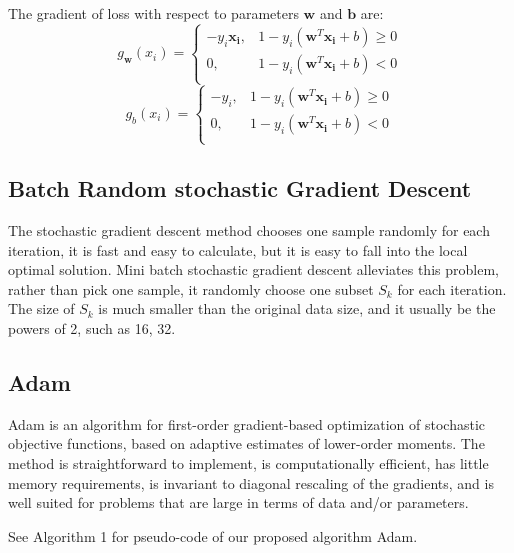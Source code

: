 \documentclass[journal, a4paper]{IEEEtran}
\begin{document}
The gradient of loss with respect to parameters $\bm{w}$ and $\bm{b}$ are:
\begin{equation}
g_{\bm{w}}(x_i)=
\left\{
             \begin{array}{lr}
             -y_i\bm{x_i}, &  1-y_i(\bm{w}^T\bm{x_i}+b) \ge 0\\
             0, & 1-y_i(\bm{w}^T\bm{x_i}+b) < 0\\
             \end{array}
\right.
\end{equation}
\begin{equation}
g_{b}(x_i)=
\left\{
             \begin{array}{lr}
             -y_i, &  1-y_i(\bm{w}^T\bm{x_i}+b) \ge 0\\
             0, & 1-y_i(\bm{w}^T\bm{x_i}+b) < 0\\
             \end{array}
\right.
\end{equation}


\subsection{Batch Random stochastic Gradient Descent}
The stochastic gradient descent method chooses one sample randomly for each iteration, it is fast and easy to calculate, but it is easy to fall into the local optimal solution. Mini batch stochastic gradient descent alleviates this problem, rather than pick one sample, it randomly choose one subset $S_k$ for each iteration. The size of $S_k$ is much smaller than the original data size, and it usually be the powers of 2, such as 16, 32.

\subsection{Adam}

Adam is an algorithm for first-order gradient-based optimization of stochastic objective functions, based on adaptive estimates of lower-order moments. The method is straightforward to implement, is computationally efficient, has little memory requirements, is invariant to diagonal rescaling of the gradients, and is well suited for problems that are large in terms of data and/or parameters.

See Algorithm 1 for pseudo-code of our proposed algorithm Adam.
\end{document}
